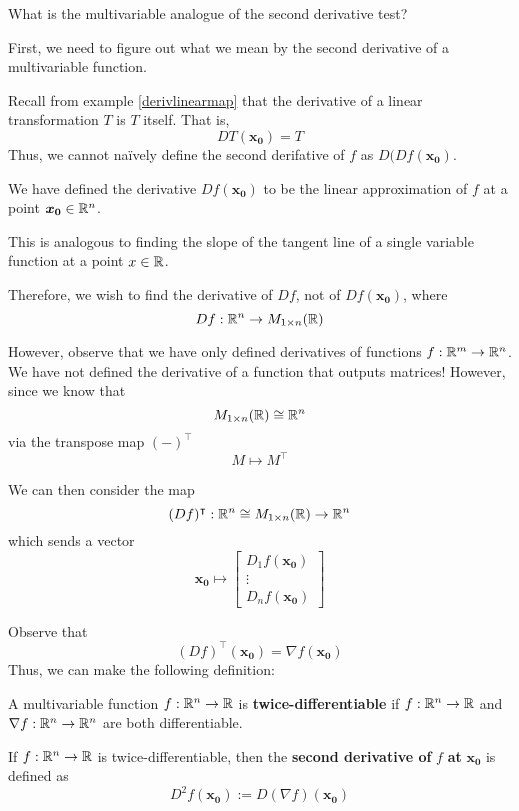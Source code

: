 \begin{motivating}
    What is the multivariable analogue of the second derivative test?
\end{motivating}

First, we need to figure out what we mean by the second derivative of a multivariable function.

Recall from example \ref{derivlinearmap} that the derivative of a linear transformation $T$ is $T$ itself. That is, 
$$DT(\bm{x_0}) = T$$
Thus, we cannot na\"ively define the second derifative of $f$ as $D(Df(\bm{x_0})$.

\begin{remark}
    We have defined the derivative $Df(\bm{x_0})$ to be the linear approximation of $f$ \textnormal{at a point} $\bm{x_0} \in \mathbb{R}^n$.
    
    This is analogous to finding the slope of the tangent line of a single variable function \textnormal{at a point} $x \in \mathbb{R}$.
    
    \end{remark}

Therefore, we wish to find the derivative of $Df$, not of $Df(\bm{x_0})$, where 
$$Df : \mathbb{R}^n \to M_{1\times n}(\mathbb{R})$$

However, observe that we have only defined derivatives of functions $f : \mathbb{R}^m \to \mathbb{R}^n$.  We have not defined the derivative of a function that outputs matrices!  However, since we know that $$M_{1\times n}(\mathbb{R}) \cong \mathbb{R}^n$$ via the transpose map $(-)^\intercal$ 
$$M \mapsto M^\intercal$$

We can then consider the map $$(Df)^\intercal : \mathbb{R}^n \cong M_{1\times n}(\mathbb{R}) \to \mathbb{R}^n$$
which sends a vector 
$$\bm{x_0} \mapsto \begin{bmatrix}
D_1f(\bm{x_0}) \\
\vdots \\
D_nf(\bm{x_0})
\end{bmatrix}$$

Observe that $$(Df)^\intercal(\bm{x_0}) =  \nabla f(\bm{x_0})$$  
Thus, we can make the following definition:

\begin{definition}
A multivariable function $f: \mathbb{R}^n \to \mathbb{R}$ is \textbf{twice-differentiable} if $f : \mathbb{R}^n \to \mathbb{R}$ and $\nabla f : \mathbb{R}^n \to \mathbb{R}^n$ are both differentiable.

\vspace{1em}

If $f: \mathbb{R}^n \to \mathbb{R}$ is twice-differentiable, then the \textbf{second derivative of} $f$ \textbf{at} $\bm{x_0}$ is defined as 
$$D^2f(\bm{x_0}) := D(\nabla f)(\bm{x_0})$$
\end{definition}

